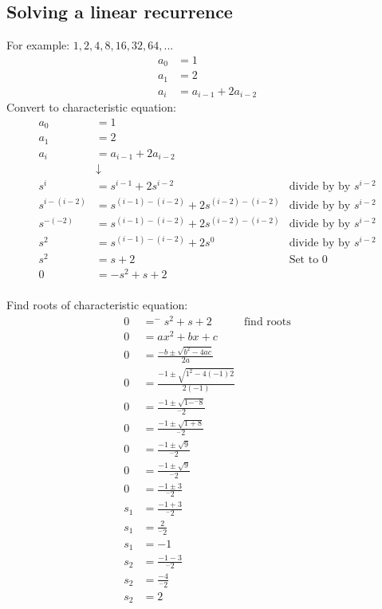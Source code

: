 \documentclass{article}
\begin{document}
\subsection{Solving a linear recurrence}
For example: $1, 2, 4, 8, 16, 32, 64, ...$
\begin{align*}
a_0 &= 1 \\
a_1 &= 2 \\
a_i &= a_{i-1} + 2a_{i-2}
\end{align*}
Convert to characteristic equation:
\begin{align*}
a_0 &= 1 & \\
a_1 &= 2 & \\
a_i &= a_{i-1} + 2a_{i-2} & \\
& \downarrow & \\
s^i &= s^{i-1} + 2s^{i-2}  & \text{divide by by $s^{i-2}$} \\
s^{i-(i-2)} &= s^{(i-1)-(i-2)} + 2s^{(i-2)-(i-2)}  & \text{divide by by $s^{i-2}$} \\
s^{-(-2)} &= s^{(i-1)-(i-2)} + 2s^{(i-2)-(i-2)}  & \text{divide by by $s^{i-2}$} \\
s^{2} &= s^{(i-1)-(i-2)} + 2s^0  & \text{divide by by $s^{i-2}$} \\
s^2 &= s + 2 & \text{Set to 0} \\
0 &= -s^2 + s + 2 & \\
\end{align*}

Find roots of characteristic equation:
\begin{align*}
0 &= ^{-}\!s^2 + s + 2 & \text{find roots}\\
0 &= ax^2 + bx + c \\
0 &= \frac{-b \pm \sqrt{b^2 - 4ac}}{2a} \\
0 &= \frac{-1 \pm \sqrt{1^2 - 4(-1)2}}{2(-1)} \\
0 &= \frac{-1 \pm \sqrt{1 - ^{-}8}}{^{-}2} \\
0 &= \frac{-1 \pm \sqrt{1 + 8}}{^{-}2} \\
0 &= \frac{-1 \pm \sqrt{9}}{^{-}2} \\
0 &= \frac{-1 \pm \sqrt{9}}{^{-}2} \\
0 &= \frac{-1 \pm 3}{^{-}2} \\
s_1 &= \frac{-1 + 3}{^{-}2} \\
s_1 &= \frac{2}{^{-}2} \\
s_1 &= -1 \\
s_2 &= \frac{-1 - 3}{^{-}2} \\
s_2 &= \frac{-4}{^{-}2} \\
s_2 &= 2 \\
\end{align*}
\end{document}
